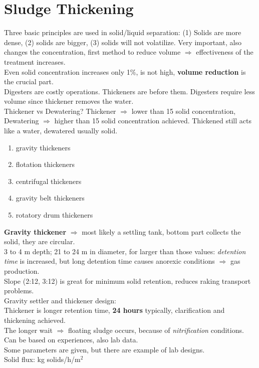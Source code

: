 \documentclass{article}
\numberwithin{equation}{section}
\begin{document}
\section{Sludge Thickening}
Three basic principles are used in solid/liquid separation: (1) Solids are more dense, (2) solids are bigger, (3) solids will not volatilize. Very important, also changes the concentration, first method to reduce volume
$\Rightarrow$ effectiveness of the treatment increases.\\
Even solid concentration increases only 1\%, is not high, \textbf{volume reduction} is the crucial part.\\
Digesters are costly operations. Thickeners are before them. Digesters require less volume since thickener removes the water.\\
Thickener vs Dewatering?
Thickener $\Rightarrow$ lower than 15 solid concentration,
Dewatering $\Rightarrow$ higher than 15 solid concentration achieved.
Thickened still acts like a water, dewatered usually solid.
\begin{enumerate}
    \item gravity thickeners
    \item flotation thickeners
    \item centrifugal thickeners
    \item gravity belt thickeners
    \item rotatory drum thickeners
\end{enumerate}
\textbf{Gravity thickener} $\Rightarrow$ most likely a settling tank, bottom part collects the solid, they are circular.\\
3 to 4 m depth; 21 to 24 m in diameter, for larger than those values: \emph{detention time} is increased, but long detention time causes anorexic conditions $\Rightarrow$ gas production.\\
Slope (2:12, 3:12) is great for minimum solid retention, reduces raking transport problems.\\
Gravity settler and thickener design:\\
Thickener is longer retention time, \textbf{24 hours} typically, clarification and thickening achieved.\\
The longer wait $\Rightarrow$ floating sludge occurs, because of \emph{nitrification} conditions.\\
Can be based on experiences, also lab data.\\
Some parameters are given, but there are example of lab designs.\\
Solid flux: kg solids/h/m$^2$
\end{document}

